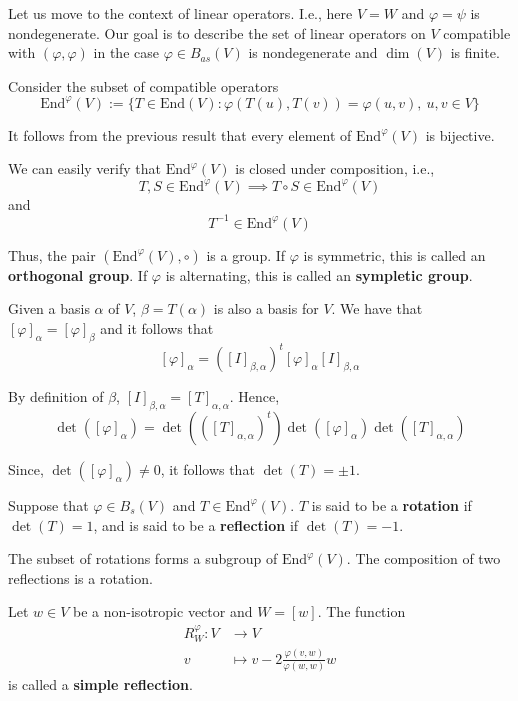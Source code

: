 Let us move to the context of linear operators. I.e., here $V = W$ and $\varphi = \psi$ is nondegenerate. Our goal is to describe the set of linear operators on $V$ compatible with $(\varphi, \varphi)$ in the case $\varphi \in B_{as}(V)$ is nondegenerate and $\dim(V)$ is finite. 

Consider the subset of compatible operators
\[
  \text{End}^\varphi(V) := \{ T \in \text{End}(V) : \varphi(T(u), T(v)) = \varphi(u, v), ~u,v \in V \}
\]

It follows from the previous result that every element of $\text{End}^\varphi(V)$ is bijective.

We can easily verify that $\text{End}^\varphi(V)$ is closed under composition, i.e., 
\[
  T, S \in \text{End}^\varphi(V) \implies T \circ S \in \text{End}^\varphi(V) 
\]
and 
\[
  T^{-1} \in \text{End}^\varphi(V)
\]

Thus, the pair $(\text{End}^\varphi(V), \circ)$ is a group. If $\varphi$ is symmetric, this is called an \textbf{orthogonal group}. If $\varphi$ is alternating, this is called an \textbf{sympletic group}.

Given a basis $\alpha$ of $V$, $\beta = T(\alpha)$ is also a basis for $V$. We have that $[\varphi]_\alpha = [\varphi]_\beta$ and it follows that 
\[
  [\varphi]_\alpha = ([I]_{\beta, \alpha})^t [\varphi]_\alpha [I]_{\beta, \alpha}
\]

By definition of $\beta$, $[I]_{\beta, \alpha} = [T]_{\alpha, \alpha}$. Hence, 
\[
  \det([\varphi]_\alpha) = \det(([T]_{\alpha, \alpha})^t) \det([\varphi]_\alpha) \det([T]_{\alpha, \alpha}) 
\]

Since, $\det([\varphi]_\alpha) \neq 0$, it follows that $\det(T) = \pm 1$. 

\begin{definition}
  Suppose that $\varphi \in B_s(V)$ and $T \in \text{End}^\varphi(V)$. $T$ is said to be a \textbf{rotation} if $\det(T) = 1$, and is said to be a \textbf{reflection} if $\det(T) = -1$.
\end{definition}

The subset of rotations forms a subgroup of $\text{End}^\varphi(V)$. The composition of two reflections is a rotation. 

\begin{definition}
  Let $w \in V$ be a non-isotropic vector and $W = [w]$. The function 
  \begin{equation*}
    \begin{aligned}
      R_W^\varphi : V &\longrightarrow V \\
      v &\longmapsto v - 2 \frac{\varphi(v,w)}{\varphi(w,w)} w
    \end{aligned}
  \end{equation*}
  is called a \textbf{simple reflection}.
\end{definition}

